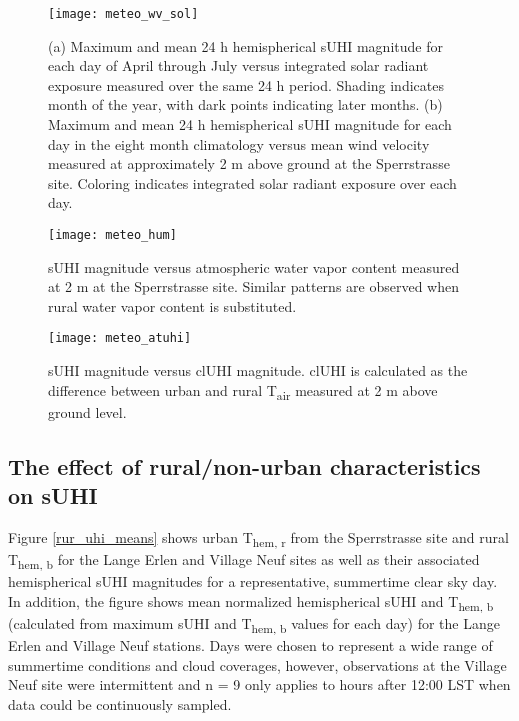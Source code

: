 \begin{bibunit}
\begin{figure}[H]
	\centering
	\texttt{[image: meteo\_wv\_sol]}
	\caption{(a) Maximum and mean 24 \si{\hour} hemispherical sUHI magnitude for each day of April through July versus integrated solar radiant exposure measured over the same 24 \si{\hour} period. Shading indicates month of the year, with dark points indicating later months. (b) Maximum and mean 24 \si{\hour} hemispherical sUHI magnitude for each day in the eight month climatology versus mean wind velocity measured at approximately 2 \si{\meter} above ground at the Sperrstrasse site. Coloring indicates integrated solar radiant exposure over each day.}
	\label{meteo_wv_sol}
\end{figure}

\begin{figure}[H]
	\centering
	\texttt{[image: meteo\_hum]}
	\caption{sUHI magnitude versus atmospheric water vapor content measured at 2 \si{\meter} at the Sperrstrasse site. Similar patterns are observed when rural water vapor content is substituted.}
	\label{meteo_hum}
\end{figure}

\begin{figure}[H]
	\centering
	\texttt{[image: meteo\_atuhi]}
	\caption{sUHI magnitude versus clUHI magnitude. clUHI is calculated as the difference between urban and rural T\textsubscript{air} measured at 2 \si{\meter} above ground level.}
	\label{meteo_atuhi}
\end{figure}

\pagebreak

\subsection{The effect of rural/non-urban characteristics on sUHI}

Figure \ref{rur_uhi_means} shows urban T\textsubscript{hem, r} from the Sperrstrasse site and rural T\textsubscript{hem, b} for the Lange Erlen and Village Neuf sites as well as their associated hemispherical sUHI magnitudes for a representative, summertime clear sky day. In addition, the figure shows mean normalized hemispherical sUHI and T\textsubscript{hem, b} (calculated from maximum sUHI and T\textsubscript{hem, b} values for each day) for the Lange Erlen and Village Neuf stations. Days were chosen to represent a wide range of summertime conditions and cloud coverages, however, observations at the Village Neuf site were intermittent and n = 9 only applies to hours after 12:00 LST when data could be continuously sampled.


\end{bibunit}
